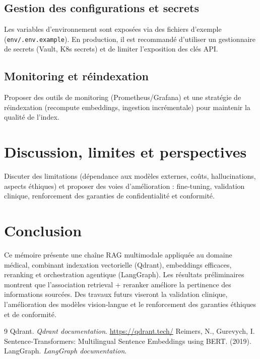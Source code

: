 \documentclass[12pt,a4paper]{report}
\begin{document}
\section{Gestion des configurations et secrets}
Les variables d'environnement sont exposées via des fichiers d'exemple (\texttt{env/.env.example}). En production, il est recommandé d'utiliser un gestionnaire de secrets (Vault, K8s secrets) et de limiter l'exposition des clés API.

\section{Monitoring et réindexation}
Proposer des outils de monitoring (Prometheus/Grafana) et une stratégie de réindexation (recompute embeddings, ingestion incrémentale) pour maintenir la qualité de l'index.

\chapter{Discussion, limites et perspectives}
Discuter des limitations (dépendance aux modèles externes, coûts, hallucinations, aspects éthiques) et proposer des voies d'amélioration : fine‑tuning, validation clinique, renforcement des garanties de confidentialité et conformité.

\chapter{Conclusion}
Ce mémoire présente une chaîne RAG multimodale appliquée au domaine médical, combinant indexation vectorielle (Qdrant), embeddings efficaces, reranking et orchestration agentique (LangGraph). Les résultats préliminaires montrent que l'association retrieval + reranker améliore la pertinence des informations sourcées. Des travaux futurs viseront la validation clinique, l'amélioration des modèles vision‑langue et le renforcement des garanties éthiques et de conformité.

\clearpage
{}
\begin{thebibliography}{9}
 Qdrant. \textit{Qdrant documentation}. \url{https://qdrant.tech/}
 Reimers, N., Gurevych, I. Sentence‑Transformers: Multilingual Sentence Embeddings using BERT. (2019).
 LangGraph. \textit{LangGraph documentation}.
\end{thebibliography}

\appendix
\end{document}
